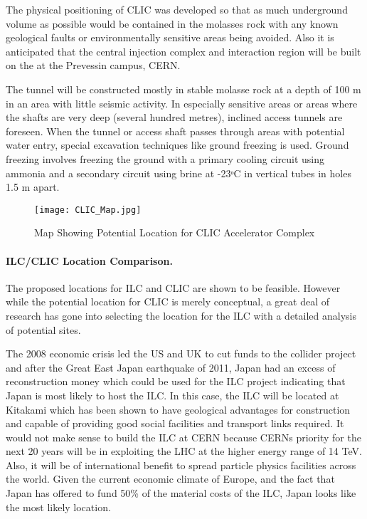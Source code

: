 The physical positioning of CLIC was developed so that as much underground volume as possible would be contained in the molasses rock with any known geological faults or environmentally sensitive areas being avoided. Also it is anticipated that the central injection complex and interaction region will be built on the at the Prevessin campus, CERN.

The tunnel will be constructed mostly in stable molasse rock at a depth of 100 m in an area with little seismic activity. In especially sensitive areas or areas where the shafts are very deep (several hundred metres), inclined access tunnels are foreseen. When the tunnel or access shaft passes through areas with potential water entry, special excavation techniques like ground freezing is used. Ground freezing involves freezing the ground with a primary cooling circuit using ammonia and a secondary circuit using brine at -23ᵒC in vertical tubes in holes 1.5 m apart.

\begin{figure}[!htb]
\centering
\texttt{[image: CLIC\_Map.jpg]}
\caption{Map Showing Potential Location for CLIC Accelerator Complex \cite{CLIC:Concept}}
\end{figure}

\paragraph{ILC/CLIC Location Comparison.}

The proposed locations for ILC and CLIC are shown to be feasible. However while the potential location for CLIC is merely conceptual, a great deal of research has gone into selecting the location for the ILC with a detailed analysis of potential sites.

The 2008 economic crisis led the US and UK to cut funds to the collider project and after the Great East Japan earthquake of 2011, Japan had an excess of reconstruction money which could be used for the ILC project indicating that Japan is most likely to host the ILC. In this case, the ILC will be located at Kitakami which has been shown to have geological advantages for construction and capable of providing good social facilities and transport links required. It would not make sense to build the ILC at CERN because CERNs priority for the next 20 years will be in exploiting the LHC at the higher energy range of 14 TeV. Also, it will be of international benefit to spread particle physics facilities across the world. Given the current economic climate of Europe, and the fact that Japan has offered to fund 50\% of the material costs of the ILC, Japan looks like the most likely location.
 
